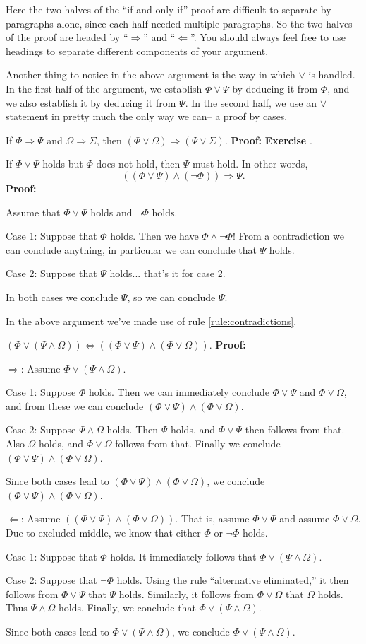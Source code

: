 \documentclass[12pt]{article}
\newcommand{\AND}{\wedge}
\newcommand{\OR}{\vee}
\newcommand{\ARR}{\Rightarrow}
\newcommand{\DARR}{\Leftrightarrow}
\newcounter{exercise}
\newcounter{rule}
\def\putExerciseHeading{\refstepcounter{exercise} \textbf{Exercise \theexercise}}
\def\putRuleNumber{\refstepcounter{rule}\therule}
\newcommand{\DRULEPF}[3]{\begin{tcolorbox}[title=Derived Rule \putRuleNumber: #1,colbacktitle=white,coltitle=black,colback=white] {#2} \tcblower \textbf{Proof:} {#3} \end{tcolorbox}}
\newcommand{\DRULEPZ}[2]{\begin{tcolorbox}[title=Derived Rule \putRuleNumber: #1,colbacktitle=white,coltitle=black,colback=white] {#2} \tcblower \textbf{Proof:} 
                         \putExerciseHeading. \end{tcolorbox}}
\def\pA{\Phi}
\def\pB{\Psi}
\def\pC{\Omega}
\def\pD{\Sigma}
\begin{document}
Here the two halves of the ``if and only if'' proof are difficult to separate by paragraphs alone, since each half needed multiple paragraphs.
So the two halves of the proof are headed by ``$\Rightarrow$'' and ``$\Leftarrow$''.
You should always feel free to use headings to separate different components of your argument.

Another thing to notice in the above argument is the way in which $\OR$ is handled.
In the first half of the argument, we establish $\pA\OR\pB$ by deducing it from $\pA$, and we also establish it by deducing it from $\pB$.
In the second half, we use an $\OR$ statement in pretty much the only way we can-- a proof by cases.

\DRULEPZ{}{If $\pA\ARR\pB$ and $\pC\ARR\pD$, then $(\pA\OR\pC)\ARR(\pB\OR\pD)$.}

\DRULEPF{Alternative Eliminated\label{DRULE:alt_elim}}{
If $\pA\OR\pB$ holds but $\pA$ does not hold, then $\pB$ must hold.
In other words,
$$((\pA\OR\pB)\AND(\neg\pA))\ARR\pB.$$
}{
Assume that $\pA\OR\pB$ holds and $\neg\pA$ holds.
\lsp

Case 1: Suppose that $\pA$ holds.
Then we have $\pA\AND\neg\pA$! From a contradiction we can conclude anything, in particular we can conclude that $\pB$ holds.
\lsp

Case 2: Suppose that $\pB$ holds... that's it for case 2.
\lsp

In both cases we conclude $\pB$, so we can conclude $\pB$.
}

In the above argument we've made use of rule \ref{rule:contradictions}.


\DRULEPF{Or Distributes over And}{
$(\pA\OR(\pB\AND\pC))\DARR((\pA\OR\pB)\AND(\pA\OR\pC))$.
}{
$\Rightarrow$:
Assume $\pA\OR(\pB\AND\pC)$.
\lsp

Case 1: Suppose $\pA$ holds. Then we can immediately conclude $\pA\OR\pB$ and $\pA\OR\pC$, and from these
we can conclude $(\pA\OR\pB)\AND(\pA\OR\pC)$.
\lsp

Case 2: Suppose $\pB\AND\pC$ holds.
Then $\pB$ holds, and $\pA\OR\pB$ then follows from that.
Also $\pC$ holds, and $\pA\OR\pC$ follows from that.
Finally we conclude $(\pA\OR\pB)\AND(\pA\OR\pC)$.
\lsp

Since both cases lead to $(\pA\OR\pB)\AND(\pA\OR\pC)$, we conclude $(\pA\OR\pB)\AND(\pA\OR\pC)$.
\lsp

$\Leftarrow$: Assume $((\pA\OR\pB)\AND(\pA\OR\pC))$.
That is, assume $\pA\OR\pB$ and assume $\pA\OR\pC$.
Due to excluded middle, we know that either $\pA$ or $\neg\pA$ holds.
\lsp

Case 1: Suppose that $\pA$ holds. It immediately follows that $\pA\OR(\pB\AND\pC)$.
\lsp

Case 2: Suppose that $\neg\pA$ holds. Using the rule ``alternative eliminated,''
it then follows from $\pA\OR\pB$ that $\pB$ holds.
Similarly, it follows from $\pA\OR\pC$ that $\pC$ holds. Thus $\pB\AND\pC$ holds.
Finally, we conclude that $\pA\OR(\pB\AND\pC)$.
\lsp

Since both cases lead to $\pA\OR(\pB\AND\pC)$, we conclude $\pA\OR(\pB\AND\pC)$.
}
\end{document}
